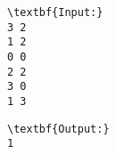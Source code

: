 \begin{verbatim}
\textbf{Input:}
3 2
1 2
0 0
2 2
3 0
1 3\end{verbatim}
\begin{verbatim}
\textbf{Output:}
1\end{verbatim}